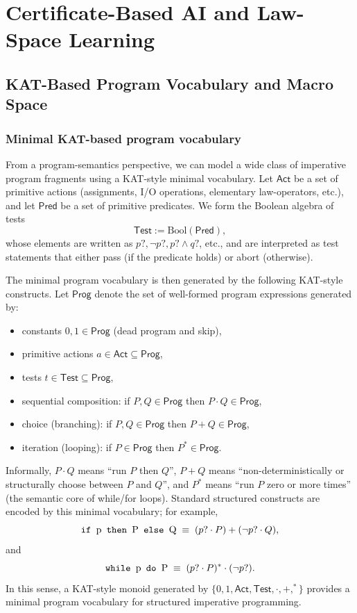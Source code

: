 \documentclass[11pt]{book}
\theoremstyle{plain}
\theoremstyle{definition}
\theoremstyle{remark}
\begin{document}
\chapter[Certificate-Based AI and Law-Space Learning]{Certificate-Based AI and Law-Space Learning}
\label{chap:certificate-based-ai}


\section{KAT-Based Program Vocabulary and Macro Space}

\subsection*{Minimal KAT-based program vocabulary}

From a program-semantics perspective, we can model a wide class of
imperative program fragments using a KAT-style minimal vocabulary.
Let $\mathsf{Act}$ be a set of primitive actions (assignments, I/O
operations, elementary law-operators, etc.), and let
$\mathsf{Pred}$ be a set of primitive predicates. We form the Boolean
algebra of tests
\[
  \mathsf{Test} := \mathrm{Bool}(\mathsf{Pred}),
\]
whose elements are written as $p?,\neg p?,p?\wedge q?$, etc., and are
interpreted as test statements that either pass (if the predicate
holds) or abort (otherwise).

The minimal program vocabulary is then generated by the following
KAT-style constructs. Let $\mathsf{Prog}$ denote the set of
well-formed program expressions generated by:
\begin{itemize}
  \item constants $0,1\in\mathsf{Prog}$ (dead program and skip),
  \item primitive actions $a\in\mathsf{Act}\subseteq\mathsf{Prog}$,
  \item tests $t\in\mathsf{Test}\subseteq\mathsf{Prog}$,
  \item sequential composition:
        if $P,Q\in\mathsf{Prog}$ then $P\cdot Q\in\mathsf{Prog}$,
  \item choice (branching):
        if $P,Q\in\mathsf{Prog}$ then $P+Q\in\mathsf{Prog}$,
  \item iteration (looping):
        if $P\in\mathsf{Prog}$ then $P^\ast\in\mathsf{Prog}$.
\end{itemize}
Informally, $P\cdot Q$ means ``run $P$ then $Q$'', $P+Q$ means
``non-deterministically or structurally choose between $P$ and $Q$'',
and $P^\ast$ means ``run $P$ zero or more times'' (the semantic core of
while/for loops). Standard structured constructs are encoded by this
minimal vocabulary; for example,
\[
  \text{\texttt{if }p\texttt{ then }P\texttt{ else }Q}
  \;\equiv\;
  (p?\cdot P) + (\neg p?\cdot Q),
\]
and
\[
  \text{\texttt{while }p\texttt{ do }P}
  \;\equiv\;
  (p?\cdot P)^\ast\cdot(\neg p?).
\]
In this sense, a KAT-style monoid generated by
$\{0,1,\mathsf{Act},\mathsf{Test},\cdot,+,^\ast\}$ provides a minimal
program vocabulary for structured imperative programming.
\end{document}
